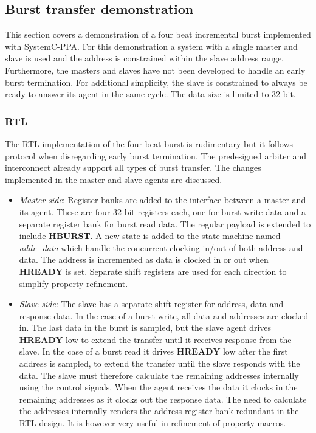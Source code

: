 \subsection{Burst transfer demonstration} 
\label{sub:burstdemo}
This section covers a demonstration of a four beat incremental burst implemented with SystemC-PPA. For this demonstration a system with a single master and slave
is used and the address is constrained within the slave address range. Furthermore, the masters and slaves have not been developed to handle an early burst termination. For additional simplicity, the slave is constrained to always be ready to answer its agent in the same cycle. The data size is limited to 32-bit.

\subsubsection{RTL}
The RTL implementation of the four beat burst is rudimentary but it follows protocol when disregarding early burst termination. The predesigned arbiter and interconnect already support all types of burst transfer. The changes implemented in the master and slave agents are discussed.
\begin{itemize}
 \item \textit{Master side}: Register banks are added to the interface between a master and its agent. These are four 32-bit registers each, one for burst write data and a separate register bank for burst read data. The regular payload is extended to include \textbf{HBURST}. A new state is added to the state machine named \textit{addr\_data} which handle the concurrent clocking in/out of both address and data. The address is incremented as data is clocked in or out when \textbf{HREADY} is set. Separate shift registers are used for each direction to simplify property refinement. 
 \item \textit{Slave side}: The slave has a separate shift register for address, data and response data. In the case of a burst write, all data and addresses are clocked in. The last data in the burst is sampled, but the slave agent drives \textbf{HREADY} low to extend the transfer until it receives response from the slave. In the case of a burst read it drives \textbf{HREADY} low after the first address is sampled, to extend the transfer until the slave responds with the data. The slave must therefore calculate the remaining addresses internally using the control signals. When the agent receives the data it clocks in the remaining addresses as it clocks out the response data. The need to calculate the addresses internally renders the address register bank redundant in the RTL design. It is however very useful in refinement of property macros. 
\end{itemize}

